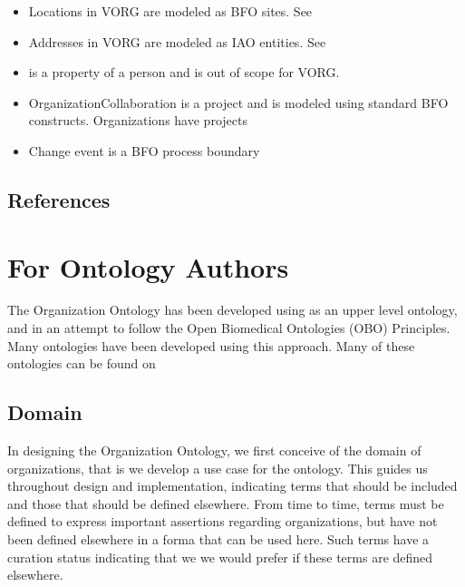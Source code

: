 \documentclass[letterpaper,10pt,english]{sphinxmanual}
\begin{document}
\begin{itemize}
\item {} 
\sphinxAtStartPar
Locations in VORG are modeled as BFO sites.  See 

\item {} 
\sphinxAtStartPar
Addresses in VORG are modeled as IAO entities.  See 

\item {} 
\sphinxAtStartPar
{} is a property of a person and is out of scope for VORG.

\item {} 
\sphinxAtStartPar
OrganizationCollaboration is a project and is modeled using standard BFO constructs.
Organizations have  projects

\item {} 
\sphinxAtStartPar
Change event is a BFO process boundary

\end{itemize}


\section{References}
\label{\detokenize{notes-and-sources:references}}

\chapter{For Ontology Authors}
\label{\detokenize{ontology-authors:for-ontology-authors}}\label{\detokenize{ontology-authors::doc}}
\sphinxAtStartPar
The Organization Ontology has been developed using  as an upper level ontology,
and in an attempt to follow the Open Biomedical Ontologies (OBO) Principles.  Many ontologies have been developed using
this approach.  Many of these ontologies can be found on 


\section{Domain}
\label{\detokenize{ontology-authors:domain}}
\sphinxAtStartPar
In designing the Organization Ontology, we first conceive of the domain of organizations,
that is we develop a use case for the ontology.  This  guides us
throughout design and implementation, indicating terms that should be included and those
that should be defined elsewhere.  From time to time, terms must be defined to
express important assertions regarding organizations, but have not been defined
elsewhere in a forma that can be used here.  Such terms have a curation status
indicating that we we would prefer if these terms are defined elsewhere.
\end{document}
